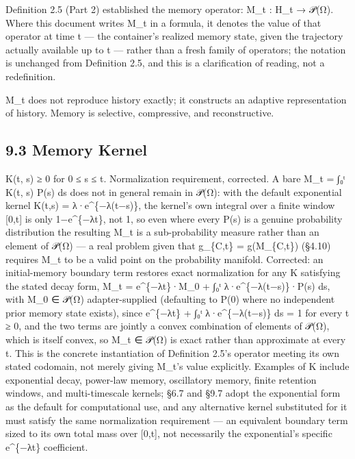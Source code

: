 \documentclass[
]{article}
\begin{document}
Definition 2.5 (Part 2) established the memory operator: M\_t : H\_t →
𝒫(Ω). Where this document writes M\_t in a formula, it denotes the value
of that operator at time t --- the container's realized memory state,
given the trajectory actually available up to t --- rather than a fresh
family of operators; the notation is unchanged from Definition 2.5, and
this is a clarification of reading, not a redefinition.

M\_t does not reproduce history exactly; it constructs an adaptive
representation of history. Memory is selective, compressive, and
reconstructive.

\hypertarget{memory-kernel}{%
\subsection{9.3 Memory Kernel}\label{memory-kernel}}

K(t, s) ≥ 0 for 0 ≤ s ≤ t. Normalization requirement, corrected. A bare
M\_t = ∫₀ᵗ K(t, s) P(s) ds does not in general remain in 𝒫(Ω): with the
default exponential kernel K(t,s) = λ·e\^{}\{−λ(t−s)\}, the kernel's own
integral over a finite window {[}0,t{]} is only 1−e\^{}\{−λt\}, not 1,
so even where every P(s) is a genuine probability distribution the
resulting M\_t is a sub-probability measure rather than an element of
𝒫(Ω) --- a real problem given that g\_\{C,t\} = g(M\_\{C,t\}) (§4.10)
requires M\_t to be a valid point on the probability manifold.
Corrected: an initial-memory boundary term restores exact normalization
for any K satisfying the stated decay form, M\_t = e\^{}\{−λt\}·M\_0 +
∫₀ᵗ λ·e\^{}\{−λ(t−s)\}·P(s) ds, with M\_0 ∈ 𝒫(Ω) adapter-supplied
(defaulting to P(0) where no independent prior memory state exists),
since e\^{}\{−λt\} + ∫₀ᵗ λ·e\^{}\{−λ(t−s)\} ds = 1 for every t ≥ 0, and
the two terms are jointly a convex combination of elements of 𝒫(Ω),
which is itself convex, so M\_t ∈ 𝒫(Ω) is exact rather than approximate
at every t. This is the concrete instantiation of Definition 2.5's
operator meeting its own stated codomain, not merely giving M\_t's value
explicitly. Examples of K include exponential decay, power-law memory,
oscillatory memory, finite retention windows, and multi-timescale
kernels; §6.7 and §9.7 adopt the exponential form as the default for
computational use, and any alternative kernel substituted for it must
satisfy the same normalization requirement --- an equivalent boundary
term sized to its own total mass over {[}0,t{]}, not necessarily the
exponential's specific e\^{}\{−λt\} coefficient.
\end{document}
